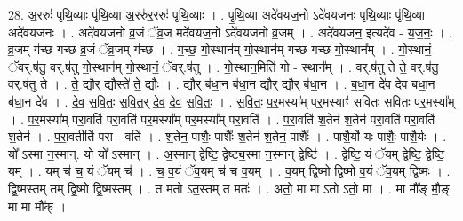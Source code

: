 \documentclass[17pt]{extarticle}
\begin{document}
28. अ॒ररुः॑ पृथि॒व्याः पृ॑थि॒व्या अ॒ररु॑र॒ररुः॑ पृथि॒व्याः । . पृ॒थि॒व्या अदे॑वयज॒नो ऽदे॑वयजनः पृथि॒व्याः पृ॑थि॒व्या अदे॑वयजनः । . अदे॑वयजनो व्र॒जं ॅव्र॒ज मदे॑वयज॒नो ऽदे॑वयजनो व्र॒जम् । . अदे॑वयजन॒ इत्यदे॑व - य॒ज॒नः॒ । . व्र॒जम् ग॑च्छ गच्छ व्र॒जं ॅव्र॒जम् ग॑च्छ । . ग॒च्छ॒ गो॒स्थान॑म् गो॒स्थान॑म् गच्छ गच्छ गो॒स्थान᳚म् । . गो॒स्थानं॒ ॅवर्.ष॑तु॒ वर्.ष॑तु गो॒स्थान॑म् गो॒स्थानं॒ ॅवर्.ष॑तु । . गो॒स्थान॒मिति॑ गो - स्थान᳚म् । . वर्.ष॑तु ते ते॒ वर्.ष॑तु॒ वर्.ष॑तु ते । . ते॒ द्यौर् द्यौस्ते॑ ते॒ द्यौः । . द्यौर् ब॑धा॒न ब॑धा॒न द्यौर् द्यौर् ब॑धा॒न । . ब॒धा॒न दे॑व देव बधा॒न ब॑धा॒न दे॑व । . दे॒व॒ स॒वि॒तः॒ स॒वि॒त॒र् दे॒व॒ दे॒व॒ स॒वि॒तः॒ । . स॒वि॒तः॒ प॒र॒मस्या᳚म् पर॒मस्याꣳ॑ सवितः सवितः पर॒मस्या᳚म् । . प॒र॒मस्या᳚म् परा॒वति॑ परा॒वति॑ पर॒मस्या᳚म् पर॒मस्या᳚म् परा॒वति॑ । . प॒रा॒वति॑ श॒तेन॑ श॒तेन॑ परा॒वति॑ परा॒वति॑ श॒तेन॑ । . प॒रा॒वतीति॑ परा - वति॑ । . श॒तेन॒ पाशैः॒ पाशैः᳚ श॒तेन॑ श॒तेन॒ पाशैः᳚ । . पाशै॒र्यो यः पाशैः॒ पाशै॒र्यः । . यो᳚ ऽस्मा न॒स्मान्. यो यो᳚ ऽस्मान् । . अ॒स्मान् द्वेष्टि॒ द्वेष्ट्य॒स्मा न॒स्मान् द्वेष्टि॑ । . द्वेष्टि॒ यं ॅयम् द्वेष्टि॒ द्वेष्टि॒ यम् । . यम् च॑ च॒ यं ॅयम् च॑ । . च॒ व॒यं ॅव॒यम् च॑ च व॒यम् । . व॒यम् द्वि॒ष्मो द्वि॒ष्मो व॒यं ॅव॒यम् द्वि॒ष्मः । . द्वि॒ष्मस्तम् तम् द्वि॒ष्मो द्वि॒ष्मस्तम् । . त मतो ऽत॒स्तम् त मतः॑ । . अतो॒ मा मा ऽतो ऽतो॒ मा । . मा मौ᳚ङ् मौ॒ङ् मा मा मौ᳚क् । \newline
\end{document}
